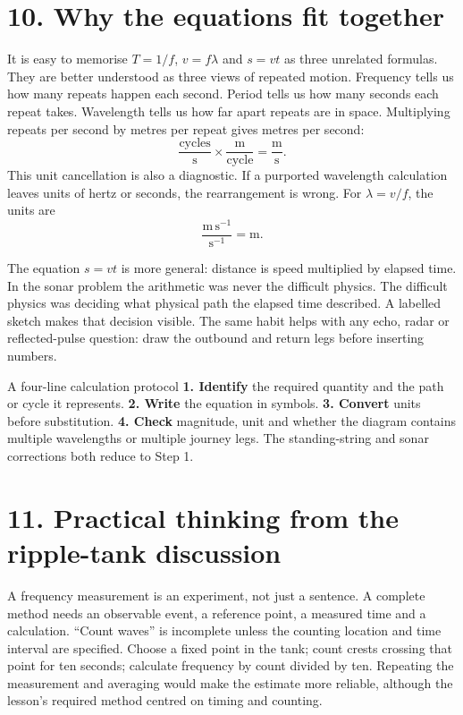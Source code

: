 \documentclass[11pt,a4paper]{article}
\begin{document}
\section*{10. Why the equations fit together}
It is easy to memorise $T=1/f$, $v=f\lambda$ and $s=vt$ as three unrelated formulas. They are better understood as three views of repeated motion. Frequency tells us how many repeats happen each second. Period tells us how many seconds each repeat takes. Wavelength tells us how far apart repeats are in space. Multiplying repeats per second by metres per repeat gives metres per second:
\[
\frac{\text{cycles}}{\mathrm{s}}\times\frac{\mathrm{m}}{\text{cycle}}=\frac{\mathrm{m}}{\mathrm{s}}.
\]
This unit cancellation is also a diagnostic. If a purported wavelength calculation leaves units of hertz or seconds, the rearrangement is wrong. For $\lambda=v/f$, the units are
\[
\frac{\mathrm{m\,s^{-1}}}{\mathrm{s^{-1}}}=\mathrm{m}.
\]

The equation $s=vt$ is more general: distance is speed multiplied by elapsed time. In the sonar problem the arithmetic was never the difficult physics. The difficult physics was deciding what physical path the elapsed time described. A labelled sketch makes that decision visible. The same habit helps with any echo, radar or reflected-pulse question: draw the outbound and return legs before inserting numbers.

\begin{mistakebox}{A four-line calculation protocol}
\textbf{1. Identify} the required quantity and the path or cycle it represents. \textbf{2. Write} the equation in symbols. \textbf{3. Convert} units before substitution. \textbf{4. Check} magnitude, unit and whether the diagram contains multiple wavelengths or multiple journey legs. The standing-string and sonar corrections both reduce to Step 1.
\end{mistakebox}

\section*{11. Practical thinking from the ripple-tank discussion}
A frequency measurement is an experiment, not just a sentence. A complete method needs an observable event, a reference point, a measured time and a calculation. ``Count waves'' is incomplete unless the counting location and time interval are specified. Choose a fixed point in the tank; count crests crossing that point for ten seconds; calculate frequency by count divided by ten. Repeating the measurement and averaging would make the estimate more reliable, although the lesson's required method centred on timing and counting.
\end{document}
